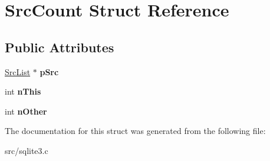 \hypertarget{struct_src_count}{\section{Src\-Count Struct Reference}
\label{struct_src_count}
}
\subsection*{Public Attributes}
\begin{DoxyCompactItemize}
\item 
\hypertarget{struct_src_count_a7087f00bcaed39cc5032462d7262f4ff}{\hyperlink{struct_src_list}{Src\-List} $\ast$ {\bfseries p\-Src}}\label{struct_src_count_a7087f00bcaed39cc5032462d7262f4ff}

\item 
\hypertarget{struct_src_count_a1aaa40ff75460ebc7778ea63aca14d4d}{int {\bfseries n\-This}}\label{struct_src_count_a1aaa40ff75460ebc7778ea63aca14d4d}

\item 
\hypertarget{struct_src_count_a5666f8571b2877fdadfe95364ffb5b80}{int {\bfseries n\-Other}}\label{struct_src_count_a5666f8571b2877fdadfe95364ffb5b80}

\end{DoxyCompactItemize}


The documentation for this struct was generated from the following file\-:\begin{DoxyCompactItemize}
\item 
src/sqlite3.\-c\end{DoxyCompactItemize}
